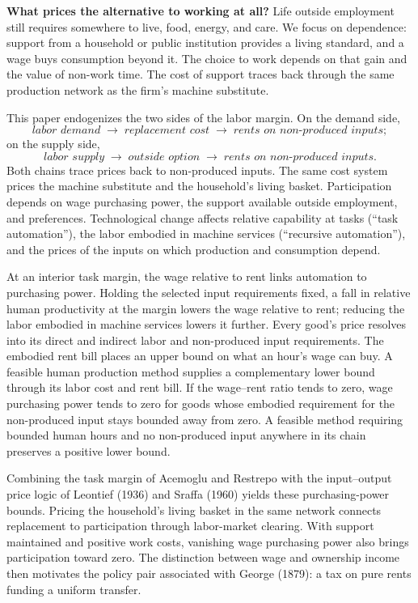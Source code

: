 \documentclass[12pt]{article}
\theoremstyle{plain}
\begin{document}
\textbf{What prices the alternative to working at all?} Life outside employment still requires somewhere to live, food, energy, and care. We focus on dependence: support from a household or public institution provides a living standard, and a wage buys consumption beyond it. The choice to work depends on that gain and the value of non-work time. The cost of support traces back through the same production network as the firm's machine substitute.

This paper endogenizes the two sides of the labor margin. On the demand side,
\[
\textit{labor demand} \;\to\; \textit{replacement cost} \;\to\; \textit{rents on non-produced inputs};
\]
on the supply side,
\[
\textit{labor supply} \;\to\; \textit{outside option} \;\to\; \textit{rents on non-produced inputs}.
\]
Both chains trace prices back to non-produced inputs. The same cost system prices the machine substitute and the household's living basket. Participation depends on wage purchasing power, the support available outside employment, and preferences. Technological change affects relative capability at tasks (``task automation''), the labor embodied in machine services (``recursive automation''), and the prices of the inputs on which production and consumption depend.

At an interior task margin, the wage relative to rent links automation to purchasing power. Holding the selected input requirements fixed, a fall in relative human productivity at the margin lowers the wage relative to rent; reducing the labor embodied in machine services lowers it further. Every good's price resolves into its direct and indirect labor and non-produced input requirements. The embodied rent bill places an upper bound on what an hour's wage can buy. A feasible human production method supplies a complementary lower bound through its labor cost and rent bill. If the wage--rent ratio tends to zero, wage purchasing power tends to zero for goods whose embodied requirement for the non-produced input stays bounded away from zero. A feasible method requiring bounded human hours and no non-produced input anywhere in its chain preserves a positive lower bound.

Combining the task margin of Acemoglu and Restrepo with the input--output price logic of Leontief (1936) and Sraffa (1960) yields these purchasing-power bounds. Pricing the household's living basket in the same network connects replacement to participation through labor-market clearing. With support maintained and positive work costs, vanishing wage purchasing power also brings participation toward zero. The distinction between wage and ownership income then motivates the policy pair associated with George (1879): a tax on pure rents funding a uniform transfer.
\end{document}
